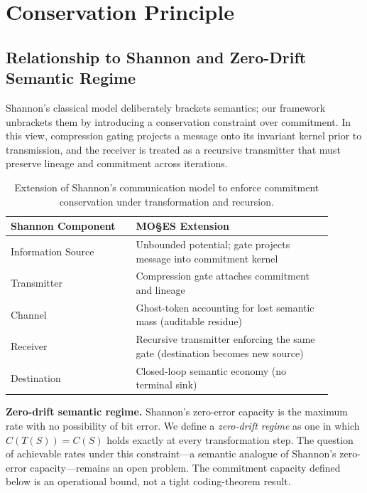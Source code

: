 \documentclass[11pt,a4paper]{article}
\begin{document}
\section{Conservation Principle}
\label{sec:conservation}

\subsection{Relationship to Shannon and Zero-Drift Semantic Regime}
\label{sec:shannon-extension}

Shannon's classical model deliberately brackets semantics; our framework unbrackets them by introducing a conservation constraint over commitment. In this view, compression gating projects a message onto its invariant kernel prior to transmission, and the receiver is treated as a recursive transmitter that must preserve lineage and commitment across iterations.

\begin{table}[htbp]
\centering
\begin{tabular}{p{0.35\linewidth}p{0.55\linewidth}}
\toprule
\textbf{Shannon Component} & \textbf{MO\S{}ES\texttrademark{} Extension} \\
\midrule
Information Source & Unbounded potential; gate projects message into commitment kernel \\
Transmitter & Compression gate attaches commitment and lineage \\
Channel & Ghost-token accounting for lost semantic mass (auditable residue) \\
Receiver & Recursive transmitter enforcing the same gate (destination becomes new source) \\
Destination & Closed-loop semantic economy (no terminal sink) \\
\bottomrule
\end{tabular}
\caption{Extension of Shannon's communication model to enforce commitment conservation under transformation and recursion.}
\label{tab:shannon-extension}
\end{table}

\noindent\textbf{Zero-drift semantic regime.} Shannon's zero-error capacity is the maximum rate with no possibility of bit error. We define a \emph{zero-drift regime} as one in which $C(T(S)) = C(S)$ holds exactly at every transformation step. The question of achievable rates under this constraint---a semantic analogue of Shannon's zero-error capacity---remains an open problem. The commitment capacity defined below is an operational bound, not a tight coding-theorem result.
\end{document}
